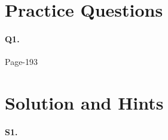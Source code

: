 \documentclass{article}
\begin{document}
\section*{Practice Questions}
\paragraph{Q1.}
\begin{flushright}
Page-193
\end{flushright}

\clearpage


\section*{Solution and Hints}
\paragraph{S1.}\
\end{document}
